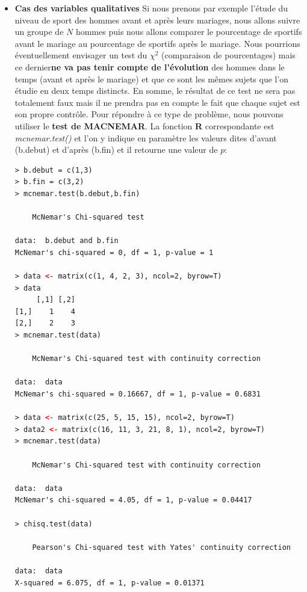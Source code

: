 \begin{itemize}
\item \textbf{Cas des variables qualitatives}\newline 
Si nous prenons par exemple l'étude du niveau de sport des hommes avant et après leurs mariages, nous allons suivre un groupe de $N$ hommes puis nous allons comparer le pourcentage de sportifs avant le mariage au pourcentage de sportifs après le mariage.\newline
Nous pourrions éventuellement envisager un test du $\chi^{2}$ (comparaison de pourcentages) mais ce dernier\textbf{ne va pas tenir compte de l'évolution} des hommes dans le temps (avant et après le mariage) et que ce sont les mêmes sujets que l'on étudie en deux temps distincts. En somme, le résultat de ce test ne sera pas totalement faux mais il ne prendra	pas en compte le fait que chaque sujet est son propre contrôle.\newline
Pour répondre à ce type de problème, nous pouvons utiliser le \textbf{test de MACNEMAR}. La fonction \textbf{R} correspondante est \textit{mcnemar.test()} et l'on y indique en paramètre les valeurs dites d'avant (b.debut) et d'après (b.fin) et il retourne une valeur de $p$:
 \begin{lstlisting}[language=html]
> b.debut = c(1,3)
> b.fin = c(3,2)
> mcnemar.test(b.debut,b.fin)

	McNemar's Chi-squared test

data:  b.debut and b.fin
McNemar's chi-squared = 0, df = 1, p-value = 1

> data <- matrix(c(1, 4, 2, 3), ncol=2, byrow=T)
> data
     [,1] [,2]
[1,]    1    4
[2,]    2    3
> mcnemar.test(data)

	McNemar's Chi-squared test with continuity correction

data:  data
McNemar's chi-squared = 0.16667, df = 1, p-value = 0.6831

> data <- matrix(c(25, 5, 15, 15), ncol=2, byrow=T)
> data2 <- matrix(c(16, 11, 3, 21, 8, 1), ncol=2, byrow=T)
> mcnemar.test(data)

	McNemar's Chi-squared test with continuity correction

data:  data
McNemar's chi-squared = 4.05, df = 1, p-value = 0.04417

> chisq.test(data)

	Pearson's Chi-squared test with Yates' continuity correction

data:  data
X-squared = 6.075, df = 1, p-value = 0.01371


\end{lstlisting}
\end{itemize}
